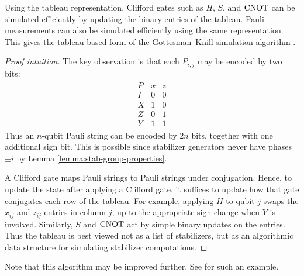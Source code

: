 \begin{theorem}
\label{thm:tableau-simulation}
Using the tableau representation, Clifford gates such as $H$, $S$, and
$\text{CNOT}$ can be simulated efficiently by updating the binary entries of the
tableau. Pauli measurements can also be simulated efficiently using the same
representation. This gives the tableau-based form of the Gottesman--Knill
simulation algorithm \cite{sim_stab_circuits}.
\end{theorem}

\begin{proof}[Proof intuition]
The key observation is that each $P_{i,j}$ may be encoded by
two bits:
\begin{align}
    \begin{array}{c|cc}
    P & x & z \\
    \hline
    I & 0 & 0 \\
    X & 1 & 0 \\
    Z & 0 & 1 \\
    Y & 1 & 1
    \end{array}
\end{align}
Thus an $n$-qubit Pauli string can be encoded by $2n$ bits, together with one
additional sign bit. This is possible since stabilizer generators never have phases $\pm i$ by Lemma \ref{lemma:stab-group-properties}.

A Clifford gate maps Pauli strings to Pauli strings under conjugation. Hence,
to update the state after applying a Clifford gate, it suffices to update how
that gate conjugates each row of the tableau. For example, applying $H$ to
qubit $j$ swaps the $x_{ij}$ and $z_{ij}$ entries in column $j$, up to the
appropriate sign change when $Y$ is involved. Similarly, $S$ and $\text{CNOT}$ act by
simple binary updates on the entries. Thus the tableau is
best viewed not as a list of stabilizers, but as an algorithmic data
structure for simulating stabilizer computations.
\end{proof}

Note that this algorithm may be improved further. See \cite{faster-sim-stab} for such an example.